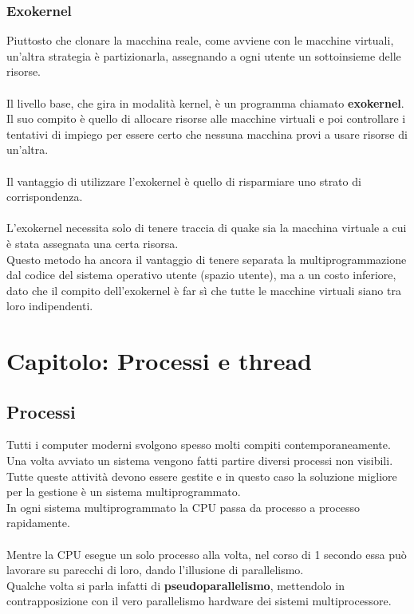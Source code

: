\documentclass{article}
\begin{document}
\subsubsection{Exokernel}
Piuttosto che clonare la macchina reale, come avviene con le macchine virtuali, un'altra strategia è partizionarla, assegnando a ogni utente un sottoinsieme delle risorse.
\\
\\
Il livello base, che gira in modalità kernel, è un programma chiamato \textbf{exokernel}. Il suo compito è quello di allocare risorse alle macchine virtuali e poi controllare i tentativi di impiego 
per essere certo che nessuna macchina provi a usare risorse di un'altra.
\\
\\
Il vantaggio di utilizzare l'exokernel è quello di risparmiare uno strato di corrispondenza.
\\
\\L'exokernel necessita solo di tenere traccia di quake sia la macchina virtuale a cui è stata assegnata una certa risorsa.
\\
Questo metodo ha ancora il vantaggio di tenere separata la multiprogrammazione dal codice del sistema operativo utente (spazio utente), ma a un costo 
inferiore, dato che il compito dell'exokernel è far sì che tutte le macchine virtuali siano tra loro indipendenti.

\newpage
\section{Capitolo: Processi e thread}
\subsection{Processi}
Tutti i computer moderni svolgono spesso molti compiti contemporaneamente.
\\
Una volta avviato un sistema vengono fatti partire diversi processi non visibili. Tutte queste attività devono essere gestite e in questo caso la soluzione migliore per la gestione è un sistema 
multiprogrammato.
\\
In ogni sistema multiprogrammato la CPU passa da processo a processo rapidamente. 
\\
\\
Mentre la CPU esegue un solo processo alla volta, nel corso di 1 secondo essa può lavorare su parecchi di loro, dando l'illusione 
di parallelismo.
\\Qualche volta si parla infatti di \textbf{pseudoparallelismo}, mettendolo in contrapposizione 
con il vero parallelismo hardware dei sistemi multiprocessore. 
\end{document}
